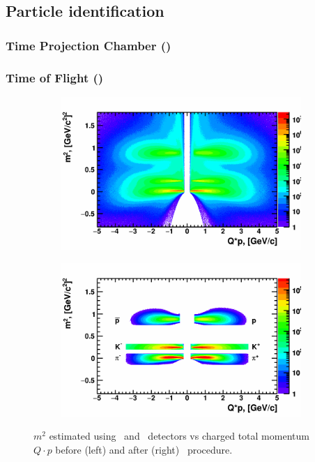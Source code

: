 \FloatBarrier
\subsection {Particle identification}

\FloatBarrier
\subsubsection{Time Projection Chamber (\TPC)}

\FloatBarrier
\subsubsection{Time of Flight (\TOF)}

\begin{figure}[ht]
    \begin{subfigure}{.49\textwidth}
        \centering
        \includegraphics[width=1.\linewidth]{Figures/M2Qp_before_PID.png}
    \end{subfigure}
    \begin{subfigure}{.49\textwidth}
        \centering
        \includegraphics[width=1.\linewidth]{Figures/M2Qp_after_PID.png}
    \end{subfigure}
    \label{fig:M2vsQp}
    \caption{$m^2$ estimated using \TPC\ and \TOF\ detectors vs charged total momentum $Q\cdot p$ before (left) and after (right) \PID\ procedure.}
\end{figure}